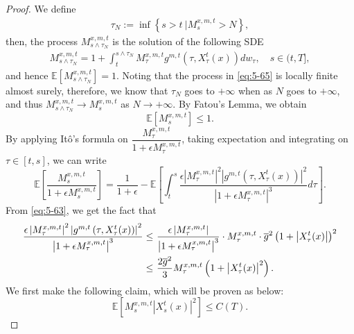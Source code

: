 \documentclass[11pt]{article}
\numberwithin{equation}{section}
\newcommand{\e}{\mathbb{E}}
\newcommand{\1}{\mbox{1\hspace{-1mm}I}}
\begin{document}
\begin{proof}
We define
\begin{align*}
    \tau_{N}:=\inf \left\{s>t\ |M^{x,m,t}_s>N \right\},
\end{align*}
then, the process $M^{x,m,t}_{s\land\tau_{N}}$ is the solution of the following SDE
\begin{equation}\label{eq:5-65}
\begin{aligned}
    M^{x,m,t}_{s\land\tau_{N}}=1+\int_{t}^{s\land\tau_{N}}M^{x,m,t}_\tau g^{m,t}\left(\tau, X^{t}_\tau(x) \right)dw_\tau,\quad s\in(t,T],
\end{aligned}
\end{equation}
and hence $\e \left[M^{x,m,t}_{s\land\tau_{N}}\right]=1$. Noting that the process in \eqref{eq:5-65} is locally finite almost surely, therefore, we know that $\tau_{N}$ goes to $+\infty$ when 
as $N$ goes to $+\infty$, and thus $M^{x,m,t}_{s\land\tau_{N}}\rightarrow M^{x,m,t}_s$
as $N\rightarrow+\infty.$ By Fatou's Lemma, we obtain 
\begin{equation}
    \e \left[M^{x,m,t}_s\right]\leq 1. \label{eq:5-66}
\end{equation}
By applying It\^o's formula on $\dfrac{M^{x,m,t}_\tau}{1+\epsilon M^{x,m,t}_\tau}$, taking expectation and integrating on $\tau\in [t,s]$, we can write
\begin{equation}\label{eq:5-63'}
    \e\left[\dfrac{M^{x,m,t}_s}{1+\epsilon M^{x,m,t}_s}\right]=\dfrac{1}{1+\epsilon}-\e\left[\int_{t}^{s}\dfrac{\epsilon \left|M^{x,m,t}_\tau\right|^{2}\left|g^{m,t}\left(\tau, X^{t}_\tau(x) \right)\right|^{2}}{\left|1+\epsilon M^{x,m,t}_\tau \right|^{3}}d\tau \right]. 
\end{equation}
From \eqref{eq:5-63}, we get the fact that
\begin{align}\label{eq:5-63''}
    \dfrac{\epsilon\left|M^{x,m,t}_\tau\right|^{2}\left|g^{m,t}\left(\tau, X^{t}_\tau(x) \right)\right|^{2}}{\left|1+\epsilon M^{x,m,t}_\tau \right|^{3}}\le\ &  \dfrac{\epsilon\left|M^{x,m,t}_\tau\right|}{\left|1+\epsilon M^{x,m,t}_\tau \right|^{3}}\cdot M^{x,m,t}_\tau\cdot  \overline{g}^2\left(1+\left|X^{t}_\tau(x)\right| \right)^{2} \notag \\
    \le\ &  \frac{2\overline{g}^2}{3} M^{x,m,t}_\tau \left(1+ \left|X^{t}_\tau(x)\right|^2\right).
\end{align}
We first make the following claim, which will be proven as below:
\begin{equation}
    \e \left[M^{x,m,t}_s \left|X^{t}_s(x)\right|^{2}\right]\leq C(T). \label{eq:5-67}

\end{equation}
\end{proof}
\end{document}
